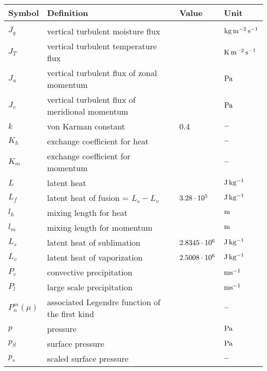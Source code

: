 \begin{tabular}{llll}
Symbol         & Definition                       & Value   & Unit \\
\hline \\

$J_q$          & vertical turbulent moisture flux           &         & $\rm kg\, m^{-2}\,
s^{-1}$ \\
$J_T$          & vertical turbulent temperature flux        &         & $\rm K\,
m^{-2}\, s^{-1}$ \\
$J_u$          & vertical turbulent flux of zonal momentum  &         & $\rm Pa$
\\
$J_v$          & vertical turbulent flux of meridional momentum &          & $\rm Pa$
\\

$k$       & von Karman constant                   & 0.4          & $\rm -$ \\
$K_h$          & exchange coefficient for heat         &         & $\rm -$ \\
$K_m$          & exchange coefficient for momentum          &         &$\rm -$ \\
$L$       & latent heat                      &         & $\rm J\, kg^{-1}$\\


$L_f$          & latent heat of fusion = $L_s - L_v$        & $\rm 3.28\cdot 10^{5}$   &
$\rm J\, kg^{-1}$ \\
$l_h$          & mixing length for heat                &         & $\rm m$ \\
$l_m$          & mixing length for momentum            &         &
$\rm m$ \\
$L_s$          & latent heat of sublimation            & $\rm 2.8345\cdot 10^{6}$ & $\rm J\,
kg^{-1}$ \\
$L_v$          & latent heat of vaporization               & $\rm 2.5008\cdot 10^{6}$
     & $\rm J\, kg^{-1}$ \\
$P_c$     & convective precipitation    &    &$\rm  m s^{-1}$ \\
$P_l$     & large scale precipitation   &    &$\rm  m s^{-1}$ \\
$P^m_n(\mu)$   & associated Legendre function of the first kind &          & $\rm -$ \\
$p$       & pressure  \hspace*{\fill}             &         & $\rm Pa$ \\
$p_S$          & surface pressure                 &         & $\rm Pa$
\\
$p_s$          & scaled surface pressure               &         & $\rm -$ \\


\end{tabular}
